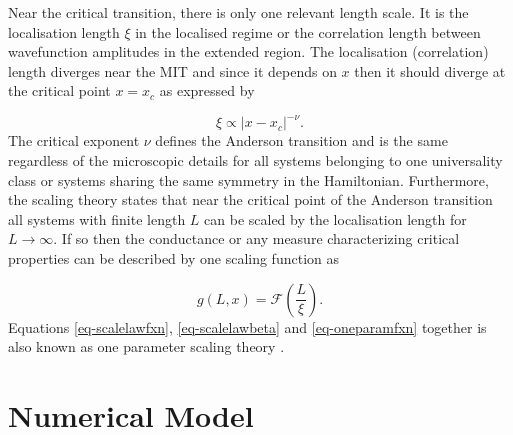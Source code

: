 Near the critical transition, there is only one relevant length scale.  It is the localisation length $\xi$ in the localised regime or the correlation length between wavefunction amplitudes in the extended region.  The localisation (correlation) length diverges near the MIT and since it depends on $x$ then it should diverge at the critical point $x=x_c$ as expressed by \cite{Car87}


\begin{equation}
 \xi \propto |x-x_c|^{-\nu}.
 \label{eq-XIdef}
\end{equation}
The critical exponent $\nu$ defines the Anderson transition and is the same regardless of the microscopic details for all systems belonging to one universality class or systems sharing the same symmetry in the Hamiltonian.
Furthermore, the scaling theory states that near the critical point of the Anderson transition all systems with finite length $L$ can be scaled by the localisation length for $L\rightarrow \infty$.  If so then the conductance or any measure characterizing critical properties can be described by one scaling function as

\begin{equation}
 g(L,x)=\mathcal{F}\left(\frac{L}{\xi}\right).
 \label{eq-oneparamfxn}
\end{equation}
Equations \eqref{eq-scalelawfxn}, \eqref{eq-scalelawbeta} and \eqref{eq-oneparamfxn} together is also known as one parameter scaling theory \cite{KraM93,MacK81,MacK83}.

\section{Numerical Model}
\label{sec-NUMERICS}

